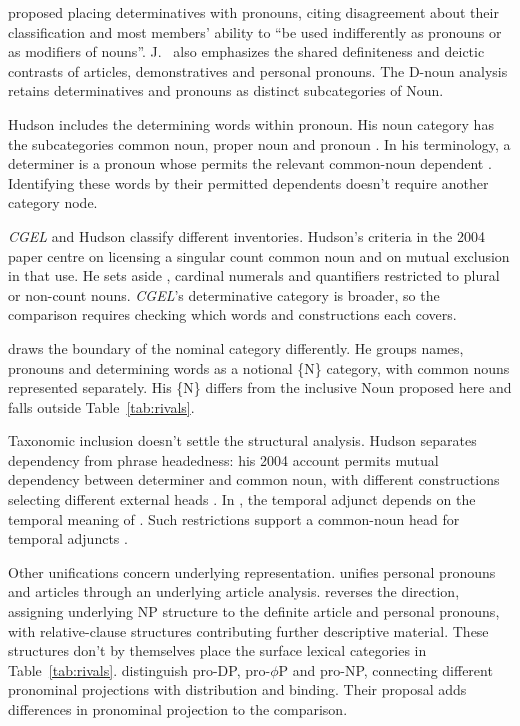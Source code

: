 \documentclass[12pt]{article}
\begin{document}
\textcite[24]{palmer1924} proposed placing determinatives with pronouns, citing disagreement about their classification and most members' ability to \enquote{be used indifferently as pronouns or as modifiers of nouns}. J.~\textcite[279]{lyons1968} also emphasizes the shared definiteness and deictic contrasts of articles, demonstratives and personal pronouns. The D-noun analysis retains determinatives and pronouns as distinct subcategories of Noun.

Hudson includes the determining words within pronoun. His noun category has the subcategories common noun, proper noun and pronoun \citep[253--254]{hudson2010wordgrammar}. In his terminology, a determiner is a pronoun whose  permits the relevant common-noun dependent \citep[9--10]{hudson2004determiners}. Identifying these words by their permitted dependents doesn't require another category node.

\textit{CGEL} and Hudson classify different inventories. Hudson's criteria in the 2004 paper centre on licensing a singular count common noun and on mutual exclusion in that use. He sets aside , cardinal numerals and quantifiers restricted to plural or non-count nouns. \textit{CGEL}'s determinative category is broader, so the comparison requires checking which words and constructions each covers.

\textcite{anderson1997notional} draws the boundary of the nominal category differently. He groups names, pronouns and determining words as a notional \{N\} category, with common nouns represented separately. His \{N\} differs from the inclusive Noun proposed here and falls outside Table~\ref{tab:rivals}.

Taxonomic inclusion doesn't settle the structural analysis. Hudson separates dependency from phrase headedness: his 2004 account permits mutual dependency between determiner and common noun, with different constructions selecting different external heads \citep[7--9]{hudson2004determiners}. In , the temporal adjunct depends on the temporal meaning of . Such restrictions support a common-noun head for temporal adjuncts \citep[10--12]{hudson2004determiners}.

Other unifications concern underlying representation. \textcite{postal1966} unifies personal pronouns and articles through an underlying article analysis. \textcite[197--203]{sommerstein1972} reverses the direction, assigning underlying NP structure to the definite article and personal pronouns, with relative-clause structures contributing further descriptive material. These structures don't by themselves place the surface lexical categories in Table~\ref{tab:rivals}. \textcite{dechainewiltschko2002} distinguish pro-DP, pro-$\phi$P and pro-NP, connecting different pronominal projections with distribution and binding. Their proposal adds differences in pronominal projection to the comparison.
\end{document}

